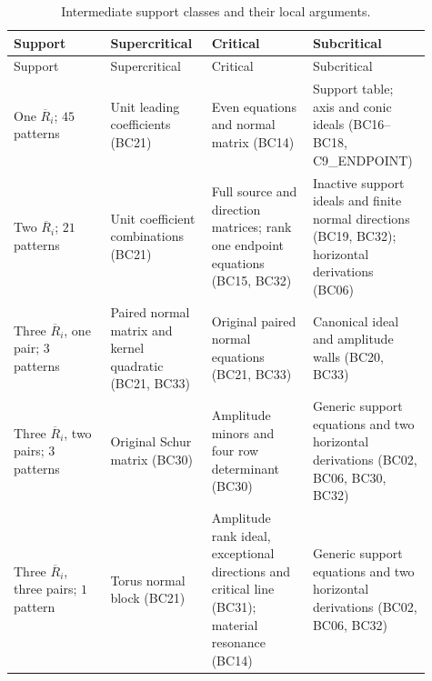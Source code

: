 \documentclass[11pt,a4paper]{article}
\numberwithin{equation}{section}
\theoremstyle{plain}
\theoremstyle{definition}
\theoremstyle{remark}
\begin{document}
\begin{longtable}{@{}p{0.22\linewidth}p{0.23\linewidth}p{0.23\linewidth}p{0.23\linewidth}@{}}
\caption{Intermediate support classes and their local arguments.}
\label{tab:r3-support-index}\\
\toprule Support & Supercritical & Critical & Subcritical\\
\midrule\endfirsthead
\toprule Support & Supercritical & Critical & Subcritical\\
\midrule\endhead
One $\overline R_i$; $45$ patterns
 & Unit leading coefficients (BC21)
 & Even equations and normal matrix (BC14)
 & Support table; axis and conic ideals
   (BC16--BC18, C9\_ENDPOINT)\\
Two $\overline R_i$; $21$ patterns
 & Unit coefficient combinations (BC21)
 & Full source and direction matrices; rank one endpoint equations
   (BC15, BC32)
 & Inactive support ideals and finite normal directions
   (BC19, BC32); horizontal derivations (BC06)\\
Three $\overline R_i$, one pair; $3$ patterns
 & Paired normal matrix and kernel quadratic (BC21, BC33)
 & Original paired normal equations (BC21, BC33)
 & Canonical ideal and amplitude walls (BC20, BC33)\\
Three $\overline R_i$, two pairs; $3$ patterns
 & Original Schur matrix (BC30)
 & Amplitude minors and four row determinant (BC30)
 & Generic support equations and two horizontal derivations
   (BC02, BC06, BC30, BC32)\\
Three $\overline R_i$, three pairs; $1$ pattern
 & Torus normal block (BC21)
 & Amplitude rank ideal, exceptional directions and critical line
   (BC31); material resonance (BC14)
 & Generic support equations and two horizontal derivations
   (BC02, BC06, BC32)\\
\bottomrule
\end{longtable}
\end{document}
